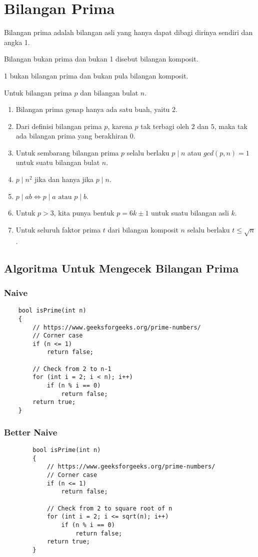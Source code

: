 \documentclass[11pt]{scrartcl}
\begin{document}
	\section{Bilangan Prima}
	Bilangan prima adalah bilangan asli yang hanya dapat dibagi dirinya sendiri dan angka 1. 
	    
	 Bilangan bukan prima dan bukan 1 disebut bilangan komposit.
	 
	 1 bukan bilangan prima dan bukan pula bilangan komposit. 
	 
	 Untuk bilangan prima $p$ dan bilangan bulat $n$.
	 \begin{enumerate}
	     \item Bilangan prima genap hanya ada satu buah, yaitu 2.
	     \item Dari definisi bilangan prima $p$, karena $p$ tak terbagi oleh $2$ dan $5$, maka tak ada bilangan prima yang berakhiran $0$.
	     \item Untuk sembarang bilangan prima $p$ selalu berlaku $p \mid n$ atau $gcd(p,n)=1$ untuk suatu bilangan bulat $n$.
	     \item $p \mid n^2$ jika dan hanya jika $p \mid n$.
	     \item $p \mid ab \iff p \mid a \text{ atau } p \mid b$.
	     \item Untuk $p > 3$, kita punya bentuk $p = 6k \pm 1$ untuk suatu bilangan asli $k$.
	     \item Untuk seluruh faktor prima $t$ dari bilangan komposit $n$ selalu berlaku $t \le \sqrt{n}$.
	  \end{enumerate}
	  
	\subsection{Algoritma Untuk Mengecek Bilangan Prima}
	\subsubsection{Naive}
	\begin{lstlisting}
	bool isPrime(int n)
	{
		// https://www.geeksforgeeks.org/prime-numbers/
	    // Corner case
	    if (n <= 1)
	        return false;
	 
	    // Check from 2 to n-1
	    for (int i = 2; i < n); i++)
	        if (n % i == 0)
	            return false;
	    return true;
	}
	\end{lstlisting}
	
	\subsubsection{Better Naive}
	\begin{lstlisting}
		bool isPrime(int n)
		{
			// https://www.geeksforgeeks.org/prime-numbers/
		    // Corner case
		    if (n <= 1)
		        return false;
		 
		    // Check from 2 to square root of n
		    for (int i = 2; i <= sqrt(n); i++)
		        if (n % i == 0)
		            return false;
		    return true;
		}
		\end{lstlisting}
	
\end{document}
